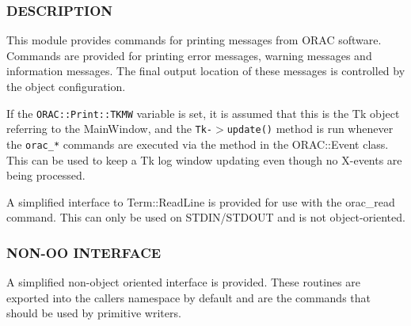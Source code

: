 \subsubsection*{DESCRIPTION\label{ORAC::Print_DESCRIPTION}}


This module provides commands for printing messages from ORAC
software. Commands are provided for printing error messages, warning
messages and information messages. The final output location of these
messages is controlled by the object configuration.



If the \texttt{ORAC::Print::TKMW} variable is set, it is assumed that this
is the Tk object referring to the MainWindow, and the
\texttt{Tk-$>$update()} method is run whenever the \texttt{orac\_*} commands are
executed via the method in the ORAC::Event class.  This can be used to
keep a Tk log window updating even though no X-events are being processed.



A simplified interface to Term::ReadLine is provided for use with
the orac\_read command. This can only be used on STDIN/STDOUT and
is not object-oriented.

\subsubsection*{NON-OO INTERFACE\label{ORAC::Print_NON-OO_INTERFACE}}


A simplified non-object oriented interface is provided.
These routines are exported into the callers namespace by default
and are the commands that should be used by primitive writers.

